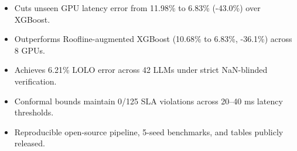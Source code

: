
\begin{itemize}
    \item Cuts unseen GPU latency error from 11.98\% to 6.83\% (-43.0\%) over XGBoost.
    \item Outperforms Roofline-augmented XGBoost (10.68\% to 6.83\%, -36.1\%) across 8 GPUs.
    \item Achieves 6.21\% LOLO error across 42 LLMs under strict NaN-blinded verification.
    \item Conformal bounds maintain 0/125 SLA violations across 20--40 ms latency thresholds.
    \item Reproducible open-source pipeline, 5-seed benchmarks, and tables publicly released.
\end{itemize}
